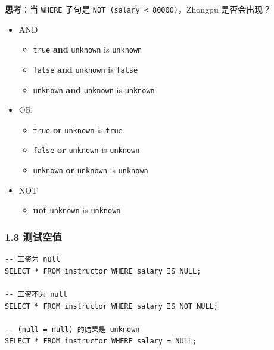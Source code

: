 \documentclass[aspectratio=169, 14pt]{beamer}
\begin{document}
\begin{frame}

	{\large {}} \textbf{思考}：当 \texttt{WHERE} 子句是 \texttt{NOT (salary < 80000)}，Zhongpu 是否会出现？
	\pause
	\begin{itemize}
		\item \alert{AND}
		      \begin{itemize}
			      \item \texttt{true} \textbf{and} \texttt{unknown} is \texttt{unknown}
			      \item \texttt{false} \textbf{and} \texttt{unknown} is \texttt{false}
			      \item \texttt{unknown} \textbf{and} \texttt{unknown} is \texttt{unknown}
		      \end{itemize}
		\item \alert{OR}
		      \begin{itemize}
			      \item \texttt{true} \textbf{or} \texttt{unknown} is \texttt{true}
			      \item \texttt{false} \textbf{or} \texttt{unknown} is \texttt{unknown}
			      \item \texttt{unknown} \textbf{or} \texttt{unknown} is \texttt{unknown}
		      \end{itemize}
		\item \alert{NOT}
		      \begin{itemize}
			      \item \textbf{not} \texttt{unknown} is \texttt{unknown}
		      \end{itemize}
	\end{itemize}
\end{frame}

\begin{frame}[fragile]
	\frametitle{1.3 测试空值}

	\begin{verbatim}
-- 工资为 null
SELECT * FROM instructor WHERE salary IS NULL;

-- 工资不为 null
SELECT * FROM instructor WHERE salary IS NOT NULL;

-- (null = null) 的结果是 unknown
SELECT * FROM instructor WHERE salary = NULL;
    \end{verbatim}

\end{frame}
\end{document}
